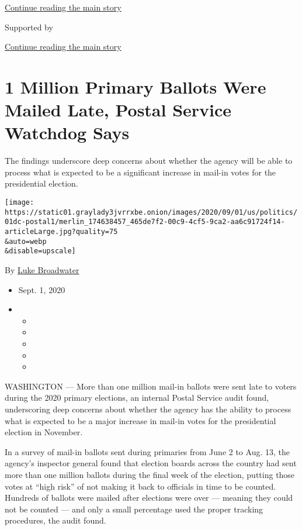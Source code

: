 \protect\hyperlink{after-top}{Continue reading the main story}

Supported by

\protect\hyperlink{after-sponsor}{Continue reading the main story}

\hypertarget{1-million-primary-ballots-were-mailed-late-postal-service-watchdog-says}{%
\section{1 Million Primary Ballots Were Mailed Late, Postal Service
Watchdog
Says}\label{1-million-primary-ballots-were-mailed-late-postal-service-watchdog-says}}

The findings underscore deep concerns about whether the agency will be
able to process what is expected to be a significant increase in mail-in
votes for the presidential election.

\texttt{[image: https://static01.graylady3jvrrxbe.onion/images/2020/09/01/us/politics/01dc-postal1/merlin\_174638457\_465de7f2-00c9-4cf5-9ca2-aa6c91724f14-articleLarge.jpg?quality=75\\\&auto=webp\\\&disable=upscale]}

By \href{https://www.nytimes3xbfgragh.onion/by/luke-broadwater}{Luke
Broadwater}

\begin{itemize}
\item
  Sept. 1, 2020
\item
  \begin{itemize}
  \item
  \item
  \item
  \item
  \item
  \end{itemize}
\end{itemize}

WASHINGTON --- More than one million mail-in ballots were sent late to
voters during the 2020 primary elections, an internal Postal Service
audit found, underscoring deep concerns about whether the agency has the
ability to process what is expected to be a major increase in mail-in
votes for the presidential election in November.

In a survey of mail-in ballots sent during primaries from June 2 to Aug.
13, the agency's inspector general found that election boards across the
country had sent more than one million ballots during the final week of
the election, putting those votes at ``high risk'' of not making it back
to officials in time to be counted. Hundreds of ballots were mailed
after elections were over --- meaning they could not be counted --- and
only a small percentage used the proper tracking procedures, the audit
found.

